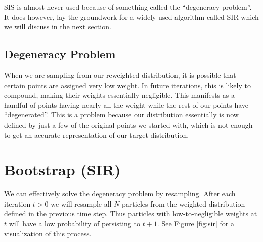 \documentclass{article}
\begin{document}
SIS is almost never used because of something called the ``degeneracy problem''. It does however, lay the groundwork for a widely used algorithm called SIR which we will discuss in the next section.

\subsection{Degeneracy Problem}
When we are sampling from our reweighted distribution, it is possible that certain points are assigned very low weight. In future iterations, this is likely to compound, making their weights essentially negligible. This manifests as a handful of points having nearly all the weight while the rest of our points have ``degenerated''. This is a problem because our distribution essentially is now defined by just a few of the original points we started with, which is not enough to get an accurate representation of our target distribution.


\section{Bootstrap (SIR)}
We can effectively solve the degeneracy problem by resampling. After each iteration $t>0$ we will resample all $N$ particles from the weighted distribution defined in the previous time step. Thus particles with low-to-negligible weights at $t$ will have a low probability of persisting to $t+1$. See Figure \ref{fig:sir} for a visualization of this process.
\end{document}
